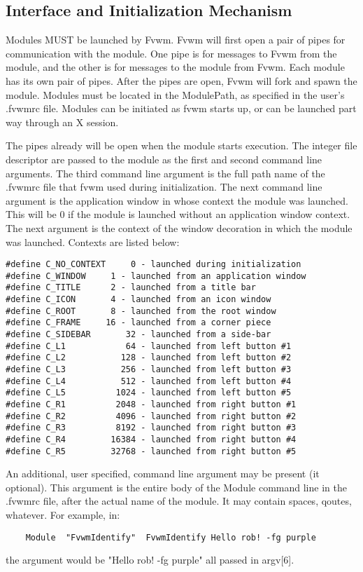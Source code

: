 \subsection{Interface and Initialization Mechanism}
Modules MUST be launched by Fvwm. Fvwm will first open a pair of pipes
for communication with the module. One pipe is for messages to Fvwm
from the module, and the other is for messages to the module from
Fvwm. Each module has its own pair of pipes. After the pipes are open,
Fvwm will fork and spawn the module. Modules must be located in the
ModulePath, as specified in the user's .fvwmrc file. Modules can be
initiated as fvwm starts up, or can be launched part way through an X
session.

The pipes already will be open when the module starts execution. The
integer file descriptor are passed to the module as the first and
second command line arguments. The third command line argument is the
full path name of the .fvwmrc file that fvwm used during
initialization. The next command line argument is the application
window in whose context the module was launched. This will be 0 if the
module is launched without an application window context. The next
argument is the context of the window decoration in which the module
was launched. Contexts are listed below:
\begin{verbatim}
#define C_NO_CONTEXT 	 0 - launched during initialization
#define C_WINDOW	 1 - launched from an application window
#define C_TITLE		 2 - launched from a title bar
#define C_ICON		 4 - launched from an icon window
#define C_ROOT		 8 - launched from the root window
#define C_FRAME		16 - launched from a corner piece
#define C_SIDEBAR       32 - launched from a side-bar
#define C_L1            64 - launched from left button #1
#define C_L2           128 - launched from left button #2
#define C_L3           256 - launched from left button #3
#define C_L4           512 - launched from left button #4
#define C_L5          1024 - launched from left button #5
#define C_R1          2048 - launched from right button #1
#define C_R2          4096 - launched from right button #2
#define C_R3          8192 - launched from right button #3
#define C_R4         16384 - launched from right button #4
#define C_R5         32768 - launched from right button #5
\end{verbatim}
An additional, user specified,  command line argument may be present
(it optional). This argument is the entire
body of the Module command line in the .fvwmrc file,
after the actual name of the module. It may contain
spaces, qoutes, whatever. For example, in:
\begin{verbatim}
	Module	"FvwmIdentify"	FvwmIdentify Hello rob! -fg purple
\end{verbatim}
the argument would be "Hello rob! -fg purple" all passed in
argv[6]. 

